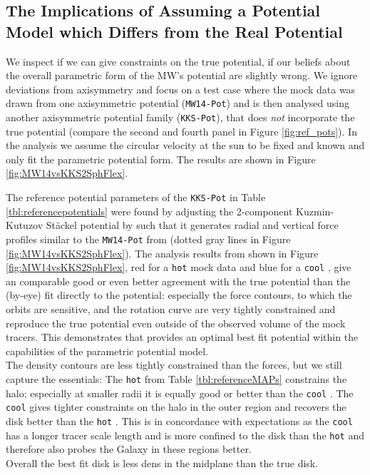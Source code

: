 \subsection{The Implications of Assuming a Potential Model which Differs from the Real Potential} \label{sec:results_potential}


We inspect if we can give constraints on the true potential, if our beliefs about the overall parametric form of the MW's potential are slightly wrong. We ignore deviations from axisymmetry and focus on a test case where the mock data was drawn from one axisymmetric potential (\texttt{MW14-Pot}) and is then analysed using another axisymmetric potential family (\texttt{KKS-Pot}), that does \emph{not} incorporate the true potential (compare the second and fourth panel in Figure \ref{fig:ref_pots}). In the analysis we assume the circular velocity at the sun to be fixed and known and only fit the parametric potential form. The results are shown in Figure \ref{fig:MW14vsKKS2SphFlex}.





The reference potential parameters of the \texttt{KKS-Pot} in Table \ref{tbl:referencepotentials} were found by adjusting the 2-component Kuzmin-Kutuzov St\"{a}ckel potential by \citet{bat94} such that it generates radial and vertical force profiles similar to the \texttt{MW14-Pot} from \citet{bov15} (dotted gray lines in Figure \ref{fig:MW14vsKKS2SphFlex}). The analysis results from \RM shown in Figure \ref{fig:MW14vsKKS2SphFlex}, red for a \texttt{hot} mock data \MAP{} and blue for a \texttt{cool} \MAP{}, give an comparable good or even better agreement with the true potential than the (by-eye) fit directly to the potential: especially the force contours, to which the orbits are sensitive, and the rotation curve are very tightly constrained and reproduce the true potential even outside of the observed volume of the mock tracers. This demonstrates that \RM provides an optimal best fit potential within the capabilities of the parametric potential model.
\\The density contours are less tightly constrained than the forces, but we still capture the essentials: The \texttt{hot} \MAP{} from Table \ref{tbl:referenceMAPs} constrains the halo; especially at smaller radii it is equally good or better than the \texttt{cool} \MAP{}. The \texttt{cool} \MAP{} gives tighter constraints on the halo in the outer region and recovers the disk better than the \texttt{hot} \MAP{}. This is in concordance with expectations as the \texttt{cool} \MAP{} has a longer tracer scale length and is more confined to the disk than the \texttt{hot} \MAP{} and therefore also probes the Galaxy in these regions better.
\\Overall the best fit disk is less dens in the midplane than the true disk. 

